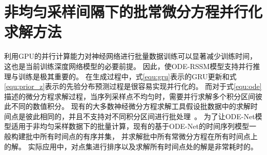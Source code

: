 \section{非均匀采样间隔下的批常微分方程并行化求解方法}
\label{sec:5_parallel_ode_solve}
利用GPU的并行计算能力对神经网络进行批量数据训练可以显著减少训练时间，这也是当前训练深度网络模型的必要前提。
因此，使ODE-RSSM模型支持并行推理与训练是极其重要的。
在生成过程中，式\eqref{equ:gru}表示的GRU更新和式\eqref{equ:prior_z}表示的先验分布预测过程是很容易实现并行化的。
而对于式\eqref{equ:ode}描述的微分方程求解过程，当序列采样点不均匀时，需要并行求解多个积分区间彼此不同的数值积分。
现有的大多数神经微分方程求解工具假设批数据中的求解时间点是彼此相同的，并且不支持对不同积分区间进行批处理~\cite{kidger2021}。
为了让ODE-Net模型适用于非均匀采样数据下的批量计算，现有的基于ODE-Net的时间序列模型\cite{yildiz2021continuous,Rubanova2019}一般构建批中所有时间点的有序并集，
并求解批中所有常微分方程在所有时间点上的解。
实际应用中，对点集进行排序以及求解所有时间点处的解是非常耗时的。


